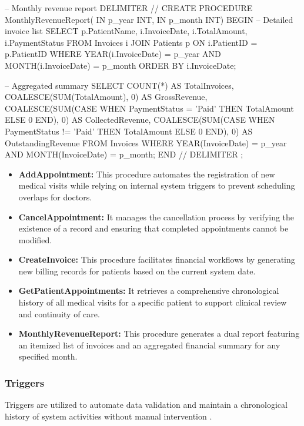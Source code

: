 \begin{sqlcode}
-- Monthly revenue report
DELIMITER //
CREATE PROCEDURE MonthlyRevenueReport(
    IN p_year INT,
    IN p_month INT)
BEGIN
    -- Detailed invoice list
    SELECT
        p.PatientName,
        i.InvoiceDate,
        i.TotalAmount,
        i.PaymentStatus
    FROM Invoices i
    JOIN Patients p ON i.PatientID = p.PatientID
    WHERE YEAR(i.InvoiceDate) = p_year
      AND MONTH(i.InvoiceDate) = p_month
    ORDER BY i.InvoiceDate;

    -- Aggregated summary
    SELECT
        COUNT(*) AS TotalInvoices,
        COALESCE(SUM(TotalAmount), 0) AS GrossRevenue,
        COALESCE(SUM(CASE WHEN PaymentStatus = 'Paid'  THEN TotalAmount ELSE 0 END), 0) AS CollectedRevenue,
        COALESCE(SUM(CASE WHEN PaymentStatus != 'Paid' THEN TotalAmount ELSE 0 END), 0) AS OutstandingRevenue
    FROM Invoices
    WHERE YEAR(InvoiceDate) = p_year
      AND MONTH(InvoiceDate) = p_month;
END //
DELIMITER ;
\end{sqlcode}

\begin{itemize}
    \item \textbf{AddAppointment:} This procedure automates the registration of new medical visits while relying on internal system triggers to prevent scheduling overlaps for doctors.\item \textbf{CancelAppointment:} It manages the cancellation process by verifying the existence of a record and ensuring that completed appointments cannot be modified.
    \item \textbf{CreateInvoice:} This procedure facilitates financial workflows by generating new billing records for patients based on the current system date.
    \item \textbf{GetPatientAppointments:} It retrieves a comprehensive chronological history of all medical visits for a specific patient to support clinical review and continuity of care.
    \item \textbf{MonthlyRevenueReport:} This procedure generates a dual report featuring an itemized list of invoices and an aggregated financial summary for any specified month.
\end{itemize}

\subsubsection*{Triggers}
Triggers are utilized to automate data validation and maintain a chronological history of system activities without manual intervention \cite{mysql_stored_programs}.

